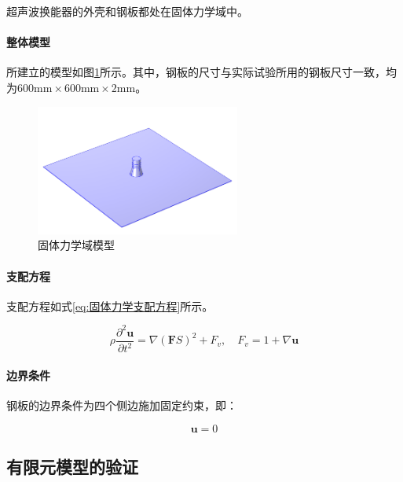 \documentclass[fontset=windows,12pt,a4paper]{ctexart}
\begin{document}
超声波换能器的外壳和钢板都处在固体力学域中。

\paragraph{整体模型}

所建立的模型如图\ref{pic:固体力学域模型}所示。其中，钢板的尺寸与实际试验所用的钢板尺寸一致，均为$600 \mathrm{mm} \times 600 \mathrm{mm} \times 2 \mathrm{mm}$。

\begin{figure}[h]
  \centering
  \includegraphics[width=0.6\textwidth]{assets/ultrasonic_transducer_plate_model.png}
  \caption{固体力学域模型}
  \label{pic:固体力学域模型}
\end{figure}

\paragraph{支配方程}

支配方程如式\eqref{eq:固体力学支配方程}所示。

\begin{equation}
  \rho \frac{\partial^2 \mathbf{u}}{\partial t^2} = \nabla (\mathbf{F}S)^2 + F_v, \quad F_v = 1 + \nabla \mathbf{u}
  \label{eq:固体力学支配方程}
\end{equation}

\paragraph{边界条件}

钢板的边界条件为四个侧边施加固定约束，即：

\begin{equation}
  \mathbf{u} = 0
  \label{eq:钢板边界条件}
\end{equation}

\subsection{有限元模型的验证}
\end{document}
